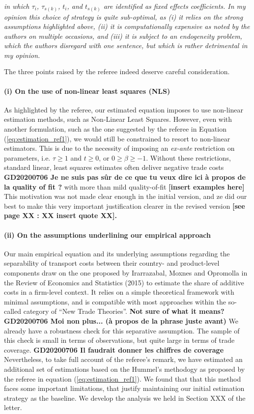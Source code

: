 \documentclass[a4paper,12pt]{article}
\begin{document}
\textit{in which $\tau_i$, $\tau_{s(k)}$, $t_i$, and $t_{s(k)}$ are identified as fixed effects coefficients.
In my opinion this choice of strategy is quite sub-optimal, as (i) it relies on
the strong assumptions highlighted above, (ii) it is computationally expensive
as noted by the authors on multiple occasions, and (iii) it is subject to an
endogeneity problem, which the authors disregard with one sentence, but which
is rather detrimental in my opinion.}

The three points raised by the referee indeed deserve careful consideration.




\paragraph{(i) On the use of non-linear least squares (NLS)}
As highlighted by the referee, our estimated equation imposes to use non-linear estimation methods, such as Non-Linear Least Squares. However, even with another formulation, such as the one suggested by the referee in Equation (\ref{eq:estimation_ref1}), we would still be constrained to resort to non-linear estimators. This is due to the necessity of imposing an \textit{ex-ante} restriction on parameters, i.e. $\tau \geq 1$ and $t \geq 0$, or $0 \geq  \beta \geq -1$. Without these restrictions, standard linear, least squares estimates often deliver negative trade costs \textbf{GD20200706 Je ne suis pas sûr de ce que tu veux dire ici à propos de la quality of fit ?}
with more than mild quality-of-fit \textbf{[insert examples here]}
This motivation was not made clear enough in the initial version, and ze did our best to make this very important justification clearer in the revised version \textbf{[see page XX : XX insert quote XX].}


\paragraph{(ii) On the assumptions underlining our empirical approach}
Our main empirical equation and its underlying assumptions regarding the separability of transport costs between their country- and product-level components draw on the one proposed by Irarrazabal, Moxnes and Opromolla in the Review of Economics and Statistics (2015) to estimate the share of additive costs in a firm-level context. It relies on a simple theoretical framework with minimal assumptions, and is compatible with most approaches within the so-called category of ``New Trade Theories''. \textbf{Not sure of what it means? } \textbf{GD20200706 Moi non plus... (à propos de la phrase juste avant)}
We already have a robustness check for this separative assumption. The sample of this check is small in terms of observations, but quite large in terms of trade coverage. 
\textbf{GD20200706 Il faudrait donner les chiffres de coverage}
Nevertheless, to take full account of the referee’s remark, we  have estimated an additional set of estimations based on the Hummel's methodogy as proposed by the referee in equation (\ref{eq:estimation_ref1}). We found that that this method faces some important limitations, that justify maintaining our initial estimation strategy as the baseline. We develop the analysis we held in Section XXX of the letter.
\end{document}
